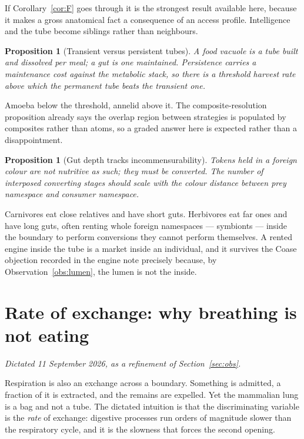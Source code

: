 \documentclass[11pt]{article}
\theoremstyle{plain}
\newtheorem{proposition}[theorem]{Proposition}
\theoremstyle{definition}
\begin{document}
If Corollary~\ref{cor:F} goes through it is the strongest result available here, because it makes a
gross anatomical fact a consequence of an access profile. Intelligence and the tube become siblings
rather than neighbours.

\begin{proposition}[Transient versus persistent tubes]
\label{prop:G}
A food vacuole is a tube built and dissolved per meal; a gut is one maintained. Persistence carries a
maintenance cost against the metabolic stack, so there is a threshold harvest rate above which the
permanent tube beats the transient one.
\end{proposition}

Amoeba below the threshold, annelid above it. The composite-resolution proposition already says the
overlap region between strategies is populated by composites rather than atoms, so a graded answer here
is expected rather than a disappointment.

\begin{proposition}[Gut depth tracks incommensurability]
\label{prop:H}
Tokens held in a foreign colour are not nutritive as such; they must be converted. The number of
interposed converting stages should scale with the colour distance between prey namespace and consumer
namespace.
\end{proposition}

Carnivores eat close relatives and have short guts. Herbivores eat far ones and have long guts, often
renting whole foreign namespaces --- symbionts --- inside the boundary to perform conversions they
cannot perform themselves. A rented engine inside the tube is a market inside an individual, and it
survives the Coase objection recorded in the engine note precisely because, by
Observation~\ref{obs:lumen}, the lumen is not the inside.

\section{Rate of exchange: why breathing is not eating}
\label{sec:rate}

\emph{Dictated 11 September 2026, as a refinement of Section~\ref{sec:obs}.}

Respiration is also an exchange across a boundary. Something is admitted, a fraction of it is
extracted, and the remains are expelled. Yet the mammalian lung is a bag and not a tube. The dictated
intuition is that the discriminating variable is the \emph{rate} of exchange: digestive processes run
orders of magnitude slower than the respiratory cycle, and it is the slowness that forces the second
opening.
\end{document}
